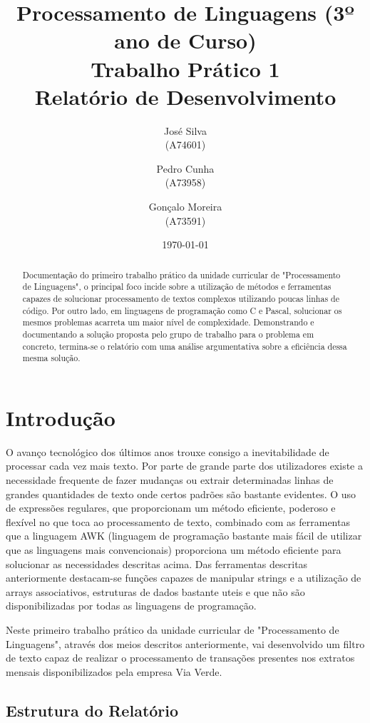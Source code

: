 \documentclass{report}
\title{Processamento de Linguagens (3º ano de Curso)\\ \textbf{Trabalho Prático 1}\\ Relatório de Desenvolvimento}
\author{José Silva\\ (A74601) \and Pedro Cunha\\ (A73958) \and Gonçalo Moreira\\ (A73591) }
\date{\today}
\begin{document}
\maketitle

\begin{abstract}
Documentação do primeiro trabalho prático da
 unidade curricular de "Processamento de Linguagens", o principal foco 
 incide sobre a utilização de métodos e ferramentas capazes de solucionar 
 processamento de textos complexos utilizando poucas linhas de código. Por 
 outro lado, em linguagens de programação como C e Pascal, solucionar os 
 mesmos problemas acarreta um maior nível de complexidade. Demonstrando e 
 documentando a solução proposta pelo grupo de trabalho para o problema em 
 concreto, termina-se o relatório com uma análise argumentativa sobre a 
 eficiência dessa mesma solução.
\end{abstract}

\tableofcontents


\chapter{Introdução} \label{intro}

O avanço tecnológico dos últimos anos trouxe consigo a inevitabilidade de processar cada vez mais texto.
Por parte de grande parte dos utilizadores existe a necessidade frequente de fazer mudanças ou extrair determinadas
linhas de grandes quantidades de texto onde certos padrões são bastante evidentes.
O uso de expressões regulares, que proporcionam um método eficiente, poderoso e flexível no que toca ao processamento de texto,
combinado com as ferramentas que a linguagem AWK (linguagem de programação bastante mais fácil de utilizar que as linguagens mais
convencionais) proporciona um método eficiente para solucionar as necessidades descritas acima. Das ferramentas descritas anteriormente
destacam-se funções capazes de manipular strings e a utilização de arrays associativos, estruturas de dados bastante uteis e que não são
disponibilizadas por todas as linguagens de programação.

Neste primeiro trabalho prático da unidade curricular de "Processamento de Linguagens", através dos meios descritos anteriormente,
vai desenvolvido um filtro de texto capaz de realizar o processamento de transações presentes nos extratos mensais disponibilizados
pela empresa Via Verde.


\section*{Estrutura do Relatório} \
\end{document}
